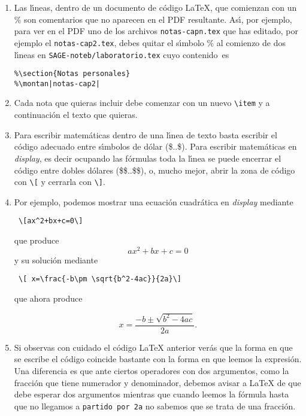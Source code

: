 \begin{appendices}
\begin{enumerate}
\item Las l\'{\i}neas, dentro de un documento de c\'odigo \LaTeX, que comienzan
con un \% son comentarios que no aparecen en el PDF resultante.  As\'{\i}, por
ejemplo, para ver en el PDF uno de los archivos 
\verb|notas-capn.tex| que has editado, por ejemplo el \verb|notas-cap2.tex|, 
debes quitar el s\'{\i}mbolo \% al comienzo de dos  l\'{\i}neas en
\verb|SAGE-noteb/laboratorio.tex| cuyo contenido~es
\begin{verbatim}
%\section{Notas personales}
%\montan|notas-cap2|
\end{verbatim}


\item Cada nota que quieras incluir debe comenzar con un nuevo \verb|\item| y a
continuaci\'on el texto que quieras. 

\item Para escribir matem\'aticas dentro de una l\'{\i}nea de texto  basta
escribir el c\'odigo adecuado entre s\'{\i}mbolos de d\'olar (\$..\$). 
Para escribir matem\'aticas en \emph{display}, es decir ocupando las f\'ormulas
toda la l\'{\i}nea se puede encerrar el c\'odigo entre dobles d\'olares 
(\$\$..\$\$), o, mucho mejor, abrir la zona de c\'odigo con \verb|\[| y 
cerrarla con \verb|\]|. 

\item Por ejemplo, podemos mostrar una ecuaci\'on cuadr\'atica en \emph{display}
mediante
\begin{verbatim}
 \[ax^2+bx+c=0\]
 \end{verbatim}
 \noindent que produce 
 \[ax^2+bx+c=0\]
 \noindent y su soluci\'on mediante 
 \begin{verbatim}
 \[ x=\frac{-b\pm \sqrt{b^2-4ac}}{2a}\]
 \end{verbatim}
\noindent que ahora produce 

\[ x=\frac{-b\pm \sqrt{b^2-4ac}}{2a}.\]

\item Si observas con cuidado el c\'odigo {\LaTeX}  anterior ver\'as que la
forma
en que se escribe el c\'odigo coincide bastante con la forma en que leemos
la expresi\'on. Una diferencia es que ante ciertos
operadores con dos argumentos, como la fracci\'on que tiene numerador y
denominador, debemos avisar a {\LaTeX}  de que debe esperar dos argumentos
mientras
que cuando leemos la f\'ormula hasta que no llegamos a \verb|partido por 2a| no
sabemos que se trata de una fracci\'on. 


\end{enumerate}
\end{appendices}
